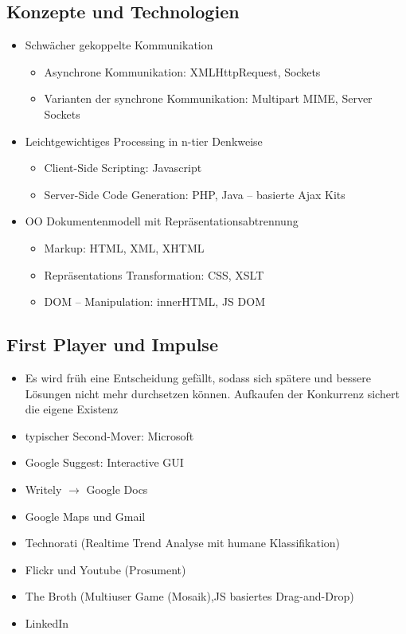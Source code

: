 \documentclass{article} %
\begin{document}
	\subsection{Konzepte und Technologien}
	\begin{itemize}
		\item Schwächer gekoppelte Kommunikation
		\begin{itemize}
			\item Asynchrone Kommunikation: XMLHttpRequest, Sockets
			\item Varianten der synchrone Kommunikation: Multipart MIME, Server Sockets
		\end{itemize}
		\item Leichtgewichtiges Processing in n-tier Denkweise
		\begin{itemize}
			\item Client-Side Scripting: Javascript
			\item Server-Side Code Generation: PHP, Java – basierte Ajax Kits
		\end{itemize}
		\item OO Dokumentenmodell mit Repräsentationsabtrennung
		\begin{itemize}
			\item Markup: HTML, XML, XHTML
			\item Repräsentations Transformation: CSS, XSLT
			\item DOM – Manipulation: innerHTML, JS DOM
		\end{itemize}
	\end{itemize}
	\subsection{First Player und Impulse}
	\begin{itemize}
		\item Es wird früh eine Entscheidung gefällt, sodass sich spätere und bessere Lösungen nicht mehr durchsetzen können. Aufkaufen der Konkurrenz sichert die eigene Existenz
		\item typischer Second-Mover: Microsoft
		\item Google Suggest: Interactive GUI
		\item Writely $\rightarrow$ Google Docs
		\item Google Maps und Gmail
		\item Technorati (Realtime Trend Analyse mit humane Klassifikation)
		\item Flickr und Youtube (Prosument)
		\item The Broth (Multiuser Game (Mosaik),JS basiertes Drag-and-Drop)  
		\item LinkedIn
	\end{itemize}
\end{document}
